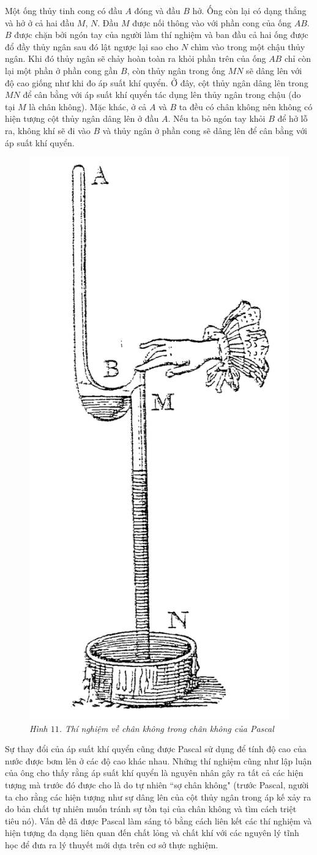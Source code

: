 \begin{multicols}{2}
	\vskip 0.1cm
	Một ống thủy tinh cong có đầu $A$ đóng và đầu $B$ hở. Ống còn lại có dạng thẳng và hở ở cả hai đầu $M$, $N$. Đầu $M$ được nối thông vào với phần cong của ống $AB$. $B$ được chặn bởi ngón tay của người làm thí nghiệm và ban đầu cả hai ống được đổ đầy thủy ngân sau đó lật ngược lại sao cho $N$ chìm vào trong một chậu thủy ngân. Khi đó thủy ngân sẽ chảy hoàn toàn ra khỏi phần trên của ống $AB$ chỉ còn lại một phần ở phần cong gần $B$, còn thủy ngân trong ống $MN$ sẽ dâng lên với độ cao giống như khi đo áp suất khí quyển. Ở đây, cột thủy ngân dâng lên trong $MN$ để cân bằng với áp suất khí quyển tác dụng lên thủy ngân trong chậu (do tại $M$ là chân không). Mặc khác, ở cả $A$ và $B$ ta đều có chân không nên không có hiện tượng cột thủy ngân dâng lên ở đầu $A$. Nếu ta bỏ ngón tay khỏi $B$ để hở lỗ ra, không khí sẽ đi vào $B$ và thủy ngân ở phần cong sẽ dâng lên để cân bằng với áp suất khí quyển.
	\begin{figure}[H]
		\vspace*{-5pt}
		\centering
		\captionsetup{labelformat= empty, justification=centering}
		\includegraphics[width= 0.45\linewidth]{14}
		\caption{\small\textit{\color{timhieukhoahoc}Hình $11$. Thí nghiệm về chân không trong chân không của Pascal}}
		\vspace*{-10pt}
	\end{figure}
	Sự thay đổi của áp suất khí quyển cũng được Pascal sử dụng để tính độ cao của nước được bơm lên ở các độ cao khác nhau. Những thí nghiệm cũng như lập luận của ông cho thấy rằng áp suất khí quyển là nguyên nhân gây ra tất cả các hiện tượng mà trước đó được cho là do tự nhiên ``sợ chân không" (trước Pascal, người ta cho rằng các hiện tượng như sự dâng lên của cột thủy ngân trong áp kế xảy ra do bản chất tự nhiên muốn tránh sự tồn tại của chân không và tìm cách triệt tiêu nó). Vấn đề đã được Pascal làm sáng tỏ bằng cách liên kết các thí nghiệm và hiện tượng đa dạng liên quan đến chất lỏng và chất khí với các nguyên lý tĩnh học để đưa ra lý  thuyết mới dựa trên cơ sở thực nghiệm.

\end{multicols}
